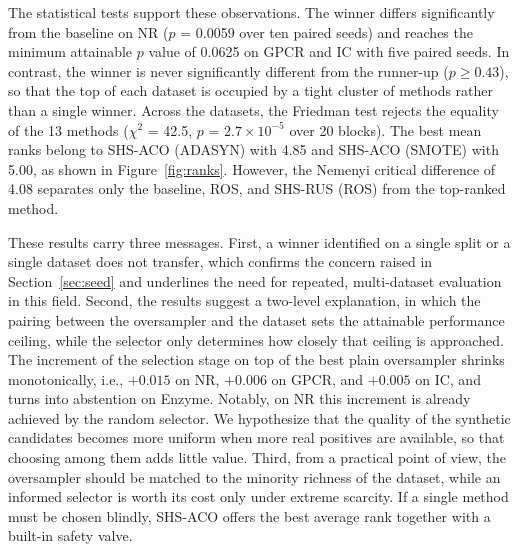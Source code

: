 \documentclass[10pt,a4paper]{article}
\begin{document}
The statistical tests support these observations. The winner differs
significantly from the baseline on NR ($p$ = 0.0059 over ten paired
seeds) and reaches the minimum attainable $p$ value of 0.0625 on GPCR
and IC with five paired seeds. In contrast, the winner is never
significantly different from the runner-up ($p \geq 0.43$), so that the
top of each dataset is occupied by a tight cluster of methods rather
than a single winner. Across the datasets, the Friedman test rejects the
equality of the 13 methods ($\chi^2$ = 42.5, $p$ = $2.7 \times
10^{-5}$ over 20 blocks). The best mean ranks belong to SHS-ACO (ADASYN)
with 4.85 and SHS-ACO (SMOTE) with 5.00, as shown in
Figure~\ref{fig:ranks}. However, the Nemenyi critical difference of
4.08 separates only the baseline, ROS, and SHS-RUS (ROS) from the
top-ranked method.

These results carry three messages. First, a winner identified on a
single split or a single dataset does not transfer, which confirms the
concern raised in Section~\ref{sec:seed} and underlines the need for repeated,
multi-dataset evaluation in this field. Second, the results suggest a
two-level explanation, in which the pairing between the oversampler and
the dataset sets the attainable performance ceiling, while the selector
only determines how closely that ceiling is approached. The increment of the
selection stage on top of the best plain oversampler shrinks
monotonically, i.e., $+0.015$ on NR, $+0.006$ on GPCR, and $+0.005$ on
IC, and turns into abstention on Enzyme. Notably, on NR this increment
is already achieved by the random selector. We hypothesize that the quality
of the synthetic candidates becomes more uniform when more real
positives are available, so that choosing among them adds little value.
Third, from a practical point of view, the oversampler should be matched
to the minority richness of the dataset, while an informed selector is
worth its cost only under extreme scarcity. If a single method must be
chosen blindly, SHS-ACO offers the best average rank together with a
built-in safety valve.

\begin{table}[htbp]
\centering
\caption{The F1 scores (mean $\pm$ SD) of the 13 methods on the four
datasets, in which bold denotes the best method of each dataset.}
\label{tab:main}
\end{table}

\begin{table}[htbp]
\centering
\caption{The best methods per dataset with the paired Wilcoxon
signed-rank tests on F1.}
\label{tab:tests}
\end{table}
\end{document}
